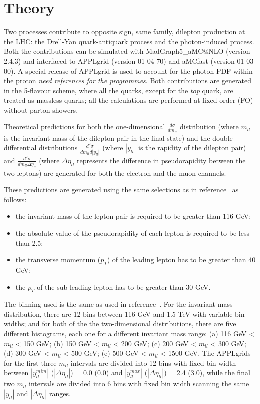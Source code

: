\section{Theory}
\label{sec:theory}

Two processes contribute to opposite sign, same family, dilepton production at the LHC: 
the Drell-Yan quark-antiquark process and the photon-induced process. Both the contributions can be 
simulated with MadGraph5{\_}aMC@NLO (version 2.4.3) and interfaced to APPLgrid (version 01-04-70) and aMCfast (version 01-03-00). A special release of APPLgrid is used to account for the photon PDF within the proton {\it need references for the programmes}.
Both contributions are generated in the 5-flavour scheme, where all the quarks, except for the \textit{top}
 quark, are treated as massless quarks; all the calculations are performed at fixed-order (FO) without 
parton showers. 

Theoretical predictions for both the one-dimensional $\frac{d\sigma}{dm_{ll}}$ distribution 
(where $m_{ll}$ is the invariant mass of the dilepton pair in the final state) and the double-differential 
distributions $\frac{d^{2}\sigma}{dm_{ll}d|y_{ll}|}$ (where $|y_{ll}|$ is the rapidity of the dilepton pair) 
and $\frac{d^{2}\sigma}{dm_{ll}\Delta\eta_{ll}}$ (where $\Delta\eta_{ll}$ represents the difference in 
pseudorapidity between the two leptons) are generated for both the electron and the muon channels.
 
These predictions are generated using the same selections as in reference~\cite{jhep08-2016-009}
as follows:
\begin{itemize}
\item the invariant mass of the lepton pair is required to be greater than 116 GeV;
\item the absolute value of the pseudorapidity of each lepton is required to be less than 2.5;
\item the transverse momentum ($p_{T}$) of the leading lepton has to be greater than 40 GeV;
\item the $p_{T}$ of the sub-leading lepton has to be greater than 30 GeV.
\end{itemize} 
The binning used is the same as used in reference~\cite{jhep08-2016-009}. For the invariant mass 
distribution, there are 12 bins between 116 GeV and 1.5 TeV with variable bin widths; and for both of the 
 the two-dimensional distributions, there are five different histograms, each one for a different invariant
 mass range: (a) 116 GeV < $m_{ll}$ < 150 GeV; (b) 150 GeV < $m_{ll}$ < 200 GeV; (c) 200 GeV < $m_{ll}$ < 300 GeV; (d) 300 GeV < $m_{ll}$ < 500 GeV; (e) 500 GeV < $m_{ll}$ < 1500 GeV.
 The APPLgrids for the first three $m_{ll}$ intervals are divided into 12 bins with fixed bin 
width between $|y_{ll}^{mim}|$ ($|\Delta\eta_{ll}|$)  = 0.0 (0.0) and $|y_{ll}^{max}|$ ($|\Delta\eta_{ll}|$) = 2.4 (3.0), while the final two $m_{ll}$ intervals are divided into 6 bins with fixed bin width scanning the same $|y_{ll}|$ and $|\Delta\eta_{ll}|$ ranges.

